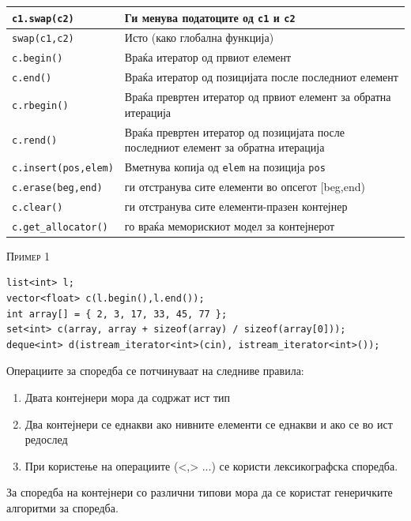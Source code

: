 \begin{center}
\begin{tabular}{ | l | p{7cm} |}
    \hline
    \texttt{c1.swap(c2)} & Ги менува податоците од \texttt{c1} и \texttt{c2} \\
    \hline
    \texttt{swap(c1,c2)} & Исто (како глобална функција)
    \\
    \hline
    \texttt{c.begin()} & Враќа итератор од првиот елемент
    \\
    \hline
    \texttt{c.end()} & Враќа итератор од позицијата после последниот елемент\\
    \hline
    \texttt{c.rbegin()} & Враќа превртен итератор од првиот елемент за
    обратна итерација
    \\
    \hline
    \texttt{c.rend()} & Враќа превртен итератор од позицијата после
    последниот елемент за обратна итерација\\
    \hline
    \texttt{c.insert(pos,elem)} & Вметнува копија од \texttt{elem} на позиција
    \texttt{pos}
    \\
    \hline
    \texttt{c.erase(beg,end)} & ги отстранува сите елементи во опсегот [beg,end)\\
    \hline
    \texttt{c.clear()} & ги отстранува сите елементи-празен контејнер \\
    \hline
    \texttt{c.get\_allocator()} & го враќа меморискиот модел за контејнерот \\
    \hline
  \end{tabular}
\end{center}

\textsc{Пример 1}

\begin{lstlisting}
list<int> l;
vector<float> c(l.begin(),l.end());
int array[] = { 2, 3, 17, 33, 45, 77 };
set<int> c(array, array + sizeof(array) / sizeof(array[0]));
deque<int> d(istream_iterator<int>(cin), istream_iterator<int>());
\end{lstlisting}

Операциите за споредба се потчинуваат на следниве правила:

\begin{enumerate}
  \item Двата контејнери мора да содржат ист тип
  \item Два контејнери се еднакви ако нивните елементи се еднакви и ако се во ист
редослед
  \item При користење на операциите (<,> ...) се користи лексикографска
  споредба.
\end{enumerate}
За споредба на контејнери со различни типови мора да се користат генеричките
алгоритми за споредба.

